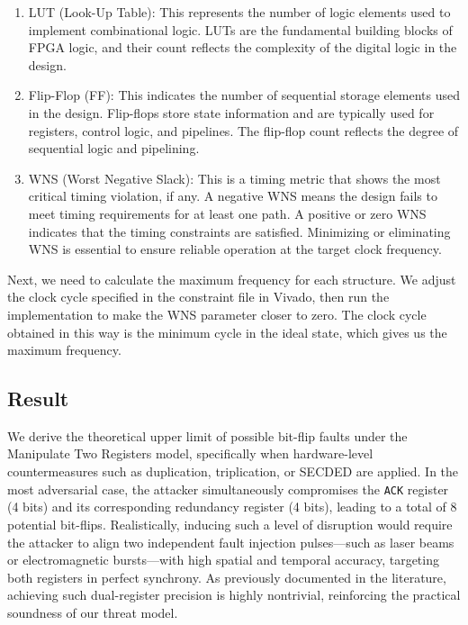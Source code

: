 \begin{enumerate}
\item LUT (Look-Up Table): This represents the number of logic elements used to implement combinational logic. LUTs are the fundamental building blocks of FPGA logic, and their count reflects the complexity of the digital logic in the design.
\item Flip-Flop (FF): This indicates the number of sequential storage elements used in the design. Flip-flops store state information and are typically used for registers, control logic, and pipelines. The flip-flop count reflects the degree of sequential logic and pipelining.
\item WNS (Worst Negative Slack): This is a timing metric that shows the most critical timing violation, if any. A negative WNS means the design fails to meet timing requirements for at least one path. A positive or zero WNS indicates that the timing constraints are satisfied. Minimizing or eliminating WNS is essential to ensure reliable operation at the target clock frequency.
\end{enumerate}

Next, we need to calculate the maximum frequency for each structure. We adjust the clock cycle specified in the constraint file in Vivado, then run the implementation to make the WNS parameter closer to zero. The clock cycle obtained in this way is the minimum cycle in the ideal state, which gives us the maximum frequency.
\subsection{Result}

We derive the theoretical upper limit of possible bit-flip faults under the Manipulate Two Registers model, specifically when hardware-level countermeasures such as duplication, triplication, or SECDED are applied. In the most adversarial case, the attacker simultaneously compromises the \texttt{ACK} register (4 bits) and its corresponding redundancy register (4 bits), leading to a total of 8 potential bit-flips. Realistically, inducing such a level of disruption would require the attacker to align two independent fault injection pulses—such as laser beams or electromagnetic bursts—with high spatial and temporal accuracy, targeting both registers in perfect synchrony. As previously documented in the literature, achieving such dual-register precision is highly nontrivial, reinforcing the practical soundness of our threat model.

